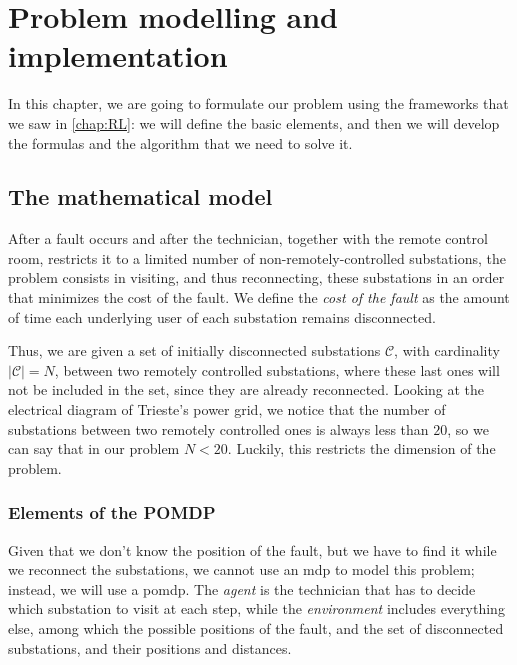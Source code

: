 \chapter{Problem modelling and implementation}
\label{chap:model}


In this chapter, we are going to formulate our problem using the frameworks that we saw in \autoref{chap:RL}: we will define the basic elements, and then we will develop the formulas and the algorithm that we need to solve it.


\section{The mathematical model}

After a fault occurs and after the technician, together with the remote control room, restricts it to a limited number of non-remotely-controlled substations, the problem consists in visiting, and thus reconnecting, these substations in an order that minimizes the cost of the fault. We define the \emph{cost of the fault} as the amount of time each underlying user of each substation remains disconnected.

Thus, we are given a set of initially disconnected substations $\mathcal C$, with cardinality $|\mathcal C| = N$, between two remotely controlled substations, where these last ones will not be included in the set, since they are already reconnected. Looking at the electrical diagram of Trieste's power grid, we notice that the number of substations between two remotely controlled ones is always less than $20$, so we can say that in our problem $N < 20$. Luckily, this restricts the dimension of the problem.

\subsection{Elements of the POMDP}

Given that we don't know the position of the fault, but we have to find it while we reconnect the substations, we cannot use an \acrshort{mdp} to model this problem; instead, we will use a \acrshort{pomdp}. The \emph{agent} is the technician that has to decide which substation to visit at each step, while the \emph{environment} includes everything else, among which the possible positions of the fault, and the set of disconnected substations, and their positions and distances.

